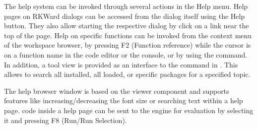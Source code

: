 The help system can be invoked through several actions in the
Help menu. Help pages on RKWard dialogs can be
accessed from the dialog itself using the
Help button. They
also allow starting the respective dialog by click on a link near the
top of the page. Help on  specific
functions can be invoked from the context
menu of the workspace browser, by pressing F2 (Function
reference) while the cursor is on a function name in the
code editor or the  console, or by using
the  
command. In addition, a tool view is provided as an interface to the
 command in
. This allows to search all installed, all
loaded, or specific  packages for a
specified topic.

The help browser window is based on the 
 viewer component and supports
features like increasing/decreasing the font size or searching text
within a help page.  code inside a help
page can be sent to the  engine for
evaluation by selecting it and pressing F8 (Run/Run
Selection).
